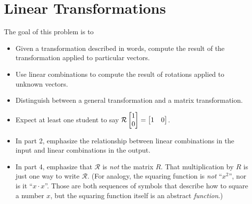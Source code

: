 \documentclass{workbook}
\newcommand{\bookonlynewpage}{\begin{bookonly}\newpage\end{bookonly}}
\begin{document}
\begin{slide}
	\bookonlynewpage
\section*{Linear Transformations}

	\question
	\begin{annotation}
		\begin{goals}

			The goal of this problem is to
			\begin{itemize}
				\item Given a transformation described in words, compute the result
					of the transformation applied to particular vectors.
				\item Use linear combinations to compute the result of rotations applied
					to unknown vectors.
				\item Distinguish between a general transformation and a matrix transformation.
			\end{itemize}
		\end{goals}

		\begin{notes}
			\begin{itemize}
				\item Expect at least one student to say $\mathcal R\mat{1\\0}=\mat{1&0}$.
				\item In part 2, emphasize the relationship between linear combinations
					in the input and linear combinations in the output.
				\item In part 4, emphasize that $\mathcal R$ is \emph{not} the matrix $R$.
					That multiplication by $R$ is just one way to write $\mathcal R$.
					(For analogy, the squaring function is \emph{not} ``$x^2$'', nor is it ``$x\cdot x$''.
					Those are both sequences of symbols that describe how to square a number $x$, but
					the squaring function itself is an abstract \emph{function}.)


\end{itemize}
\end{notes}
\end{annotation}
\end{slide}
\end{document}
